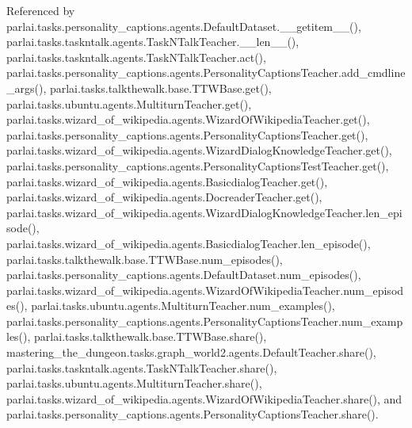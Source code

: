 Referenced by parlai.\+tasks.\+personality\+\_\+captions.\+agents.\+Default\+Dataset.\+\_\+\+\_\+getitem\+\_\+\+\_\+(), parlai.\+tasks.\+taskntalk.\+agents.\+Task\+N\+Talk\+Teacher.\+\_\+\+\_\+len\+\_\+\+\_\+(), parlai.\+tasks.\+taskntalk.\+agents.\+Task\+N\+Talk\+Teacher.\+act(), parlai.\+tasks.\+personality\+\_\+captions.\+agents.\+Personality\+Captions\+Teacher.\+add\+\_\+cmdline\+\_\+args(), parlai.\+tasks.\+talkthewalk.\+base.\+T\+T\+W\+Base.\+get(), parlai.\+tasks.\+ubuntu.\+agents.\+Multiturn\+Teacher.\+get(), parlai.\+tasks.\+wizard\+\_\+of\+\_\+wikipedia.\+agents.\+Wizard\+Of\+Wikipedia\+Teacher.\+get(), parlai.\+tasks.\+personality\+\_\+captions.\+agents.\+Personality\+Captions\+Teacher.\+get(), parlai.\+tasks.\+wizard\+\_\+of\+\_\+wikipedia.\+agents.\+Wizard\+Dialog\+Knowledge\+Teacher.\+get(), parlai.\+tasks.\+personality\+\_\+captions.\+agents.\+Personality\+Captions\+Test\+Teacher.\+get(), parlai.\+tasks.\+wizard\+\_\+of\+\_\+wikipedia.\+agents.\+Basicdialog\+Teacher.\+get(), parlai.\+tasks.\+wizard\+\_\+of\+\_\+wikipedia.\+agents.\+Docreader\+Teacher.\+get(), parlai.\+tasks.\+wizard\+\_\+of\+\_\+wikipedia.\+agents.\+Wizard\+Dialog\+Knowledge\+Teacher.\+len\+\_\+episode(), parlai.\+tasks.\+wizard\+\_\+of\+\_\+wikipedia.\+agents.\+Basicdialog\+Teacher.\+len\+\_\+episode(), parlai.\+tasks.\+talkthewalk.\+base.\+T\+T\+W\+Base.\+num\+\_\+episodes(), parlai.\+tasks.\+personality\+\_\+captions.\+agents.\+Default\+Dataset.\+num\+\_\+episodes(), parlai.\+tasks.\+wizard\+\_\+of\+\_\+wikipedia.\+agents.\+Wizard\+Of\+Wikipedia\+Teacher.\+num\+\_\+episodes(), parlai.\+tasks.\+ubuntu.\+agents.\+Multiturn\+Teacher.\+num\+\_\+examples(), parlai.\+tasks.\+personality\+\_\+captions.\+agents.\+Personality\+Captions\+Teacher.\+num\+\_\+examples(), parlai.\+tasks.\+talkthewalk.\+base.\+T\+T\+W\+Base.\+share(), mastering\+\_\+the\+\_\+dungeon.\+tasks.\+graph\+\_\+world2.\+agents.\+Default\+Teacher.\+share(), parlai.\+tasks.\+taskntalk.\+agents.\+Task\+N\+Talk\+Teacher.\+share(), parlai.\+tasks.\+ubuntu.\+agents.\+Multiturn\+Teacher.\+share(), parlai.\+tasks.\+wizard\+\_\+of\+\_\+wikipedia.\+agents.\+Wizard\+Of\+Wikipedia\+Teacher.\+share(), and parlai.\+tasks.\+personality\+\_\+captions.\+agents.\+Personality\+Captions\+Teacher.\+share().

\mbox{\label{classparlai_1_1tasks_1_1personality__captions_1_1agents_1_1DefaultDataset_a6463726aaf7a9bd790e11f049f0e7459}} 
